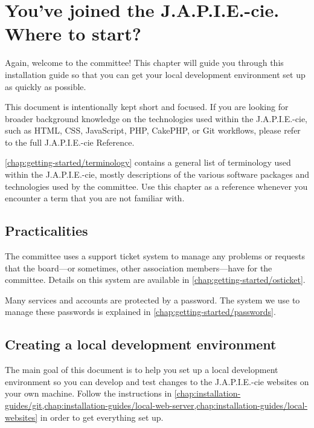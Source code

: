 \chapter{You've joined the J.A.P.I.E.-cie. Where to start?} \label{chap:getting-started/where-to-start}

Again, welcome to the committee! This chapter will guide you through this installation guide so that you can get your local development environment set up as quickly as possible.

This document is intentionally kept short and focused. If you are looking for broader background knowledge on the technologies used within the J.A.P.I.E.-cie, such as HTML, CSS, JavaScript, PHP, CakePHP, or Git workflows, please refer to the full J.A.P.I.E.-cie Reference.

\cref{chap:getting-started/terminology} contains a general list of terminology used within the J.A.P.I.E.-cie, mostly descriptions of the various software packages and technologies used by the committee. Use this chapter as a reference whenever you encounter a term that you are not familiar with.

\section*{Practicalities}

The committee uses a support ticket system to manage any problems or requests that the board---or sometimes, other association members---have for the committee. Details on this system are available in \cref{chap:getting-started/osticket}.

Many services and accounts are protected by a password. The system we use to manage these passwords is explained in \cref{chap:getting-started/passwords}.

\section*{Creating a local development environment}

The main goal of this document is to help you set up a local development environment so you can develop and test changes to the J.A.P.I.E.-cie websites on your own machine. Follow the instructions in \cref{chap:installation-guides/git,chap:installation-guides/local-web-server,chap:installation-guides/local-websites} in order to get everything set up.

\clearpage
